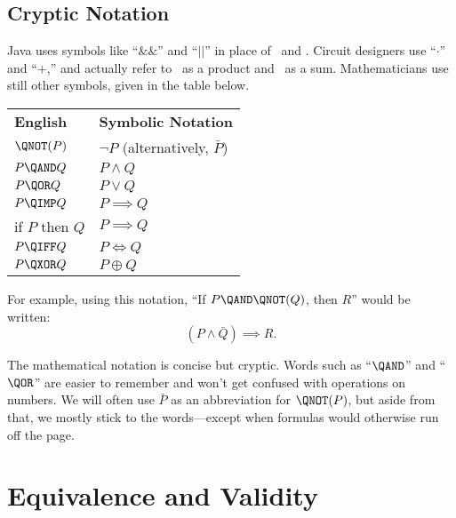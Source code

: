 \subsection{Cryptic Notation}
Java uses symbols like ``$\&\&$'' and ``$||$'' in place of \QAND\ and
\QOR.  Circuit designers use ``$\cdot$'' and ``$+$,'' and actually refer
to \QAND\ as a product and \QOR\ as a sum.  Mathematicians use still
other symbols, given in the table below.
\begin{center}
\begin{tabular}{ll}
\textbf{English} & \textbf{Symbolic Notation} \\[1ex]
$\QNOT(P)$ & $\neg P$ \quad (alternatively, $\bar{P}$) \\
$P \QAND Q$ & $P \land Q$ \\
$P \QOR Q$ & $P \lor Q$ \\
$P \QIMP Q$ & $P \implies Q$ \\
if $P$ then $Q$ & $P \implies Q$ \\
$P \QIFF Q$ & $P \iff Q$\\
$P \QXOR Q$ & $P \oplus Q$
\end{tabular}
\end{center}
For example, using this notation, ``If $P \QAND \QNOT(Q)$, then $R$''
would be written:
\[
    (P \land \bar{Q}) \implies R.
\]

The mathematical notation is concise but cryptic.  Words such as
``$\QAND$'' and ``$\QOR$'' are easier to remember and won't get
confused with operations on numbers.  We will often use $\bar{P}$ as
an abbreviation for $\QNOT(P)$, but aside from that, we mostly stick
to the words---except when formulas would otherwise run off the page.

\begin{problems}
\classproblems
{}

\homeworkproblems
{}

\examproblems
{}
\end{problems}

\section{Equivalence and Validity}\label{equiv_valid_sec}

